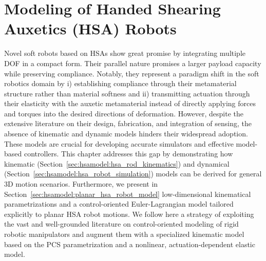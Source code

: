 \chapter{Modeling of Handed Shearing Auxetics (HSA) Robots}
\label{chp:hsamodel}

\begin{foreword}
    Novel soft robots based on \glspl{HSA} show great promise by integrating multiple \gls{DOF} in a compact form. Their parallel nature promises a larger payload capacity while preserving compliance. Notably, they represent a paradigm shift in the soft robotics domain by i) establishing compliance through their metamaterial structure rather than material softness and ii) transmitting actuation through their elasticity with the auxetic metamaterial instead of directly applying forces and torques into the desired directions of deformation.
    However, despite the extensive literature on their design, fabrication, and integration of sensing, the absence of kinematic and dynamic models hinders their widespread adoption. These models are crucial for developing accurate simulators and effective model-based controllers.
    This chapter addresses this gap by demonstrating how kinematic (Section~\ref{sec:hsamodel:hsa_rod_kinematics}) and dynamical (Section~\ref{sec:hsamodel:hsa_robot_simulation}) models can be derived for general 3D motion scenarios. Furthermore, we present in Section~\ref{sec:hsamodel:planar_hsa_robot_model} low-dimensional kinematical parametrizations and a control-oriented Euler-Lagrangian model tailored explicitly to planar \gls{HSA} robot motions.
    We follow here a strategy of exploiting the vast and well-grounded literature on control-oriented modeling of rigid robotic manipulators and augment them with a specialized kinematic model based on the \gls{PCS} parametrization and a nonlinear, actuation-dependent elastic model.
\end{foreword}



